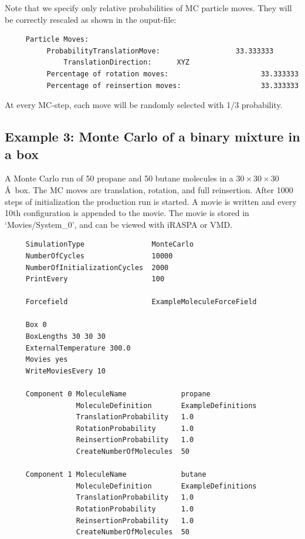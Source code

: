 Note that we specify only relative probabilities of MC particle moves. They will be correctly rescaled as shown in the ouput-file:
\begin{tiny}
\begin{verbatim}
     Particle Moves:
          ProbabilityTranslationMove:                  33.333333
              TranslationDirection:      XYZ
          Percentage of rotation moves:                      33.333333
          Percentage of reinsertion moves:                   33.333333
\end{verbatim}
\end{tiny}
At every MC-step, each move will be randomly selected with 1/3 probability.


\subsection*{Example 3: Monte Carlo of a binary mixture in a box}
A Monte Carlo run of 50 propane and 50 butane molecules in a $30\times30\times30$ \AA\ box. The MC moves are
translation, rotation, and full reinsertion.
After 1000 steps of initialization the production run is started.
A movie is written and every 10th configuration is appended to the movie. 
The movie is stored in `Movies/System\_0',
and can be viewed with iRASPA or VMD.

\begin{tiny}
\begin{verbatim}
     SimulationType                MonteCarlo
     NumberOfCycles                10000
     NumberOfInitializationCycles  2000
     PrintEvery                    100
     
     Forcefield                    ExampleMoleculeForceField
     
     Box 0
     BoxLengths 30 30 30
     ExternalTemperature 300.0
     Movies yes
     WriteMoviesEvery 10
     
     Component 0 MoleculeName             propane
                 MoleculeDefinition       ExampleDefinitions
                 TranslationProbability   1.0
                 RotationProbability      1.0
                 ReinsertionProbability   1.0
                 CreateNumberOfMolecules  50
     
     Component 1 MoleculeName             butane
                 MoleculeDefinition       ExampleDefinitions
                 TranslationProbability   1.0
                 RotationProbability      1.0
                 ReinsertionProbability   1.0
                 CreateNumberOfMolecules  50
\end{verbatim}
\end{tiny}

